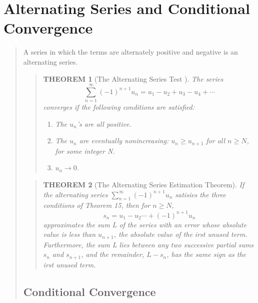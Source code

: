 \documentclass{report}
\newtheorem{theorem}{THEOREM}
\begin{document}
\section{Alternating Series and Conditional Convergence }
\begin{quote}

	A series in which the terms are alternately positive and negative is an alternating series. 

	\begin{quote}
		\begin{theorem}[The Alternating Series Test ]

			The series
			$$\sum_{n=1}^{\infty}(-1)^{n+1}u_n=u_1-u_2+u_3-u_4+\cdots$$
			converges if the following conditions are satisfied:

			\begin{enumerate}
				\item The $u_n$'s are all positive.
				\item The $u_n$ are eventually nonincreasing: $u_n \ge u_{n+1}$ for all $n\ge N$, for some integer N.
				\item $u_n \to 0$.
			\end{enumerate}

		\end{theorem}
	\end{quote}

	\begin{quote}
		\begin{theorem}[The Alternating Series Estimation Theorem]
			\mbox{}\par %

			If the alternating series $\sum_{n=1}^{\infty} (-1)^{n+1} u_n$ satisies the three conditions of Theorem 15, then for $n \ge N$, 
			$$s_n = u_1 - u_2 \cdots + (-1)^{n+1}u_n$$
			approximates the sum L of the series with an error whose absolute value is less than $u_{n+1}$, the absolute value of the irst unused term. Furthermore, the sum L lies between any two successive partial sums $s_n$ and $s_{n+1}$, and the remainder, $L - s_n$, has the same sign as the irst unused term.

		\end{theorem}
	\end{quote}

	\subsection{Conditional Convergence}
	\begin{quote}
		

\end{quote}
\end{quote}
\end{document}
